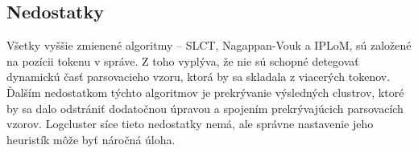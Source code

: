 \subsection{Nedostatky}
Všetky vyššie zmienené algoritmy -- SLCT, Nagappan-Vouk a IPLoM, sú založené na pozícii tokenu v správe. Z toho vyplýva, že nie sú schopné detegovať dynamickú časť parsovacieho vzoru, ktorá by sa skladala z viacerých tokenov. Ďalším nedostatkom týchto algoritmov je prekrývanie výsledných clustrov, ktoré by sa dalo odstrániť dodatočnou úpravou a spojením prekrývajúcich parsovacích vzorov. Logcluster síce tieto nedostatky nemá, ale správne nastavenie jeho heuristík môže byť náročná úloha.